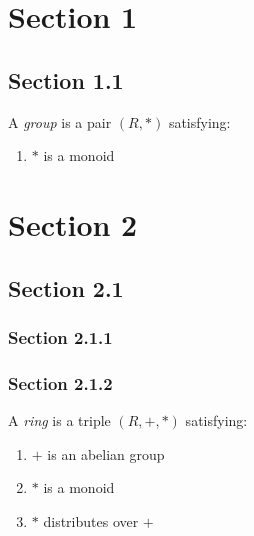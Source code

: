 \hypertarget{sec:1}{%
\section{\texorpdfstring{\label{sec:1}Section
1}{Section 1}}\label{sec:1}}

\hypertarget{sec:11}{%
\subsection{\texorpdfstring{\label{sec:11}Section
1.1}{Section 1.1}}\label{sec:11}}

\leavevmode\hypertarget{dfn:group}{}%
A \emph{group} is a pair \((R,*)\) satisfying:

\begin{enumerate}
\tightlist
\item
  \protect\hypertarget{cl:grpmul}{}{\(*\) is a monoid}
\end{enumerate}

\hypertarget{sec:2}{%
\section{\texorpdfstring{\label{sec:2}Section
2}{Section 2}}\label{sec:2}}

\hypertarget{sec:21}{%
\subsection{\texorpdfstring{\label{sec:21}Section
2.1}{Section 2.1}}\label{sec:21}}

\hypertarget{sec:211}{%
\subsubsection{\texorpdfstring{\label{sec:211}Section
2.1.1}{Section 2.1.1}}\label{sec:211}}

\hypertarget{sec:212}{%
\subsubsection{\texorpdfstring{\label{sec:212}Section
2.1.2}{Section 2.1.2}}\label{sec:212}}

\leavevmode\hypertarget{dfn:ring}{}%
A \emph{ring} is a triple \((R,+,*)\) satisfying:

\begin{enumerate}
\tightlist
\item
  \protect\hypertarget{cl:addgp}{}{\(+\) is an abelian group}
\item
  \protect\hypertarget{cl:multmon}{}{\(*\) is a monoid}
\item
  \protect\hypertarget{cl:distrib}{}{\(*\) distributes over \(+\)}
\end{enumerate}

